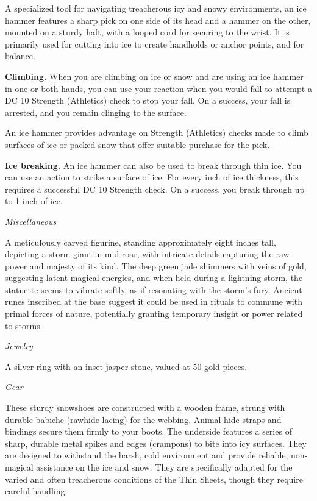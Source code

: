\documentclass[
  letterpaper,12pt,twoside,twocolumn,openany,
  nodeprecatedcode,bg=full]{dndbook}
\begin{document}
A specialized tool for navigating treacherous icy and snowy
environments, an ice hammer features a sharp pick on one side of its
head and a hammer on the other, mounted on a sturdy haft, with a looped
cord for securing to the wrist. It is primarily used for cutting into
ice to create handholds or anchor points, and for balance.

\textbf{Climbing.} When you are climbing on ice or snow and are using an
ice hammer in one or both hands, you can use your reaction when you
would fall to attempt a DC 10 Strength (Athletics) check to stop your
fall. On a success, your fall is arrested, and you remain clinging to
the surface.

An ice hammer provides advantage on Strength (Athletics) checks made to
climb surfaces of ice or packed snow that offer suitable purchase for
the pick.

\textbf{Ice breaking.} An ice hammer can also be used to break through
thin ice. You can use an action to strike a surface of ice. For every
inch of ice thickness, this requires a successful DC 10 Strength check.
On a success, you break through up to 1 inch of ice.

{\emph{Miscellaneous}}

A meticulously carved figurine, standing approximately eight inches
tall, depicting a storm giant in mid-roar, with intricate details
capturing the raw power and majesty of its kind. The deep green jade
shimmers with veins of gold, suggesting latent magical energies, and
when held during a lightning storm, the statuette seems to vibrate
softly, as if resonating with the storm's fury. Ancient runes inscribed
at the base suggest it could be used in rituals to commune with primal
forces of nature, potentially granting temporary insight or power
related to storms.

{\emph{Jewelry}}

A silver ring with an inset jasper stone, valued at 50 gold pieces.

{\emph{Gear}}

These sturdy snowshoes are constructed with a wooden frame, strung with
durable babiche (rawhide lacing) for the webbing. Animal hide straps and
bindings secure them firmly to your boots. The underside features a
series of sharp, durable metal spikes and edges (crampons) to bite into
icy surfaces. They are designed to withstand the harsh, cold environment
and provide reliable, non-magical assistance on the ice and snow. They
are specifically adapted for the varied and often treacherous conditions
of the Thin Sheets, though they require careful handling.
\end{document}
